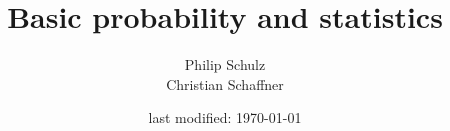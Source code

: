 \documentclass[11pt,leqno,a4paper]{report}
\author{Philip Schulz \\ Christian Schaffner}
\title{Basic probability and statistics}
\date{last modified: \today}
\begin{document}
\begin{titlepage}
\maketitle
\end{titlepage}

\tableofcontents




\end{document}
